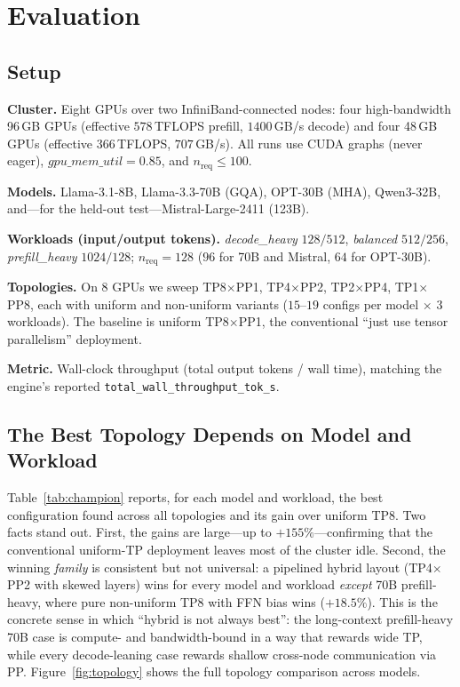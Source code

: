 \documentclass[twocolumn]{article}
\begin{document}
\section{Evaluation}

\subsection{Setup}

\textbf{Cluster.} Eight GPUs over two InfiniBand-connected nodes: four high-bandwidth 96\,GB GPUs (effective $578$\,TFLOPS prefill, $1400$\,GB/s decode) and four 48\,GB GPUs (effective $366$\,TFLOPS, $707$\,GB/s). All runs use CUDA graphs (never eager), $\textit{gpu\_mem\_util}=0.85$, and $n_{\text{req}}\le 100$.

\textbf{Models.} Llama-3.1-8B, Llama-3.3-70B (GQA), OPT-30B (MHA), Qwen3-32B, and---for the held-out test---Mistral-Large-2411 (123B).

\textbf{Workloads (input/output tokens).} \textit{decode\_heavy} $128/512$, \textit{balanced} $512/256$, \textit{prefill\_heavy} $1024/128$; $n_{\text{req}}{=}128$ ($96$ for 70B and Mistral, $64$ for OPT-30B).

\textbf{Topologies.} On 8 GPUs we sweep TP8$\times$PP1, TP4$\times$PP2, TP2$\times$PP4, TP1$\times$PP8, each with uniform and non-uniform variants ($15$--$19$ configs per model $\times$ 3 workloads). The baseline is uniform TP8$\times$PP1, the conventional ``just use tensor parallelism'' deployment.

\textbf{Metric.} Wall-clock throughput (total output tokens / wall time), matching the engine's reported \texttt{total\_wall\_throughput\_tok\_s}.

\subsection{The Best Topology Depends on Model and Workload}
\label{sec:eval-topology}

Table~\ref{tab:champion} reports, for each model and workload, the best configuration found across all topologies and its gain over uniform TP8. Two facts stand out. First, the gains are large---up to $+155\%$---confirming that the conventional uniform-TP deployment leaves most of the cluster idle. Second, the winning \emph{family} is consistent but not universal: a pipelined hybrid layout (TP4$\times$PP2 with skewed layers) wins for every model and workload \emph{except} 70B prefill-heavy, where pure non-uniform TP8 with FFN bias wins ($+18.5\%$). This is the concrete sense in which ``hybrid is not always best'': the long-context prefill-heavy 70B case is compute- and bandwidth-bound in a way that rewards wide TP, while every decode-leaning case rewards shallow cross-node communication via PP. Figure~\ref{fig:topology} shows the full topology comparison across models.
\end{document}

